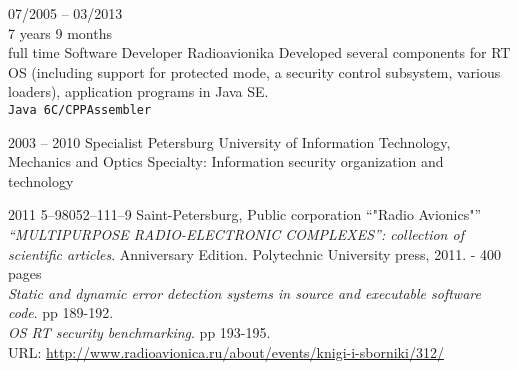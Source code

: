 \begin{entrylist}
        \entry
        {07/2005 -- 03/2013\\\footnotesize{7 years 9 months\\full time}}
        {Software Developer}
        {Radioavionika}
        {
            Developed several components for RT OS (including support for protected mode, a security control subsystem, various loaders), application programs in Java SE. \\
        \texttt{Java 6}\slashsep\texttt{C/CPP}\slashsep\texttt{Assembler}}

    \end{entrylist}



    \begin{entrylist}
        \entry
        {2003 -- 2010}
        {Specialist}
        {Petersburg University of Information Technology, Mechanics and Optics}
        {Specialty: Information security organization and technology}
    \end{entrylist}


    \begin{entrylist}
        \entry
        {2011}
        {5–98052–111–9}
        {Saint-Petersburg, Public corporation \enquote{"Radio Avionics"}}
        {\textit{\enquote{MULTIPURPOSE RADIO-ELECTRONIC COMPLEXES}: collection of scientific articles}. Anniversary Edition. Polytechnic University press, 2011. - 400 pages \\
        \textit{Static and dynamic error detection systems in source and executable software code}. pp 189-192. \\
        \textit{OS RT security benchmarking}. pp 193-195.\\
        URL: \url{http://www.radioavionica.ru/about/events/knigi-i-sborniki/312/}
        }
    \end{entrylist}
